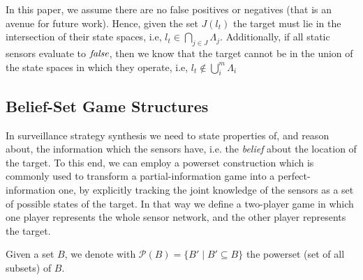 In this paper, we assume there are no false positives or negatives (that is an avenue for future work). Hence, given the set $J(l_t)$ the target must lie in the intersection of their state spaces, i.e, $l_t \in \bigcap_{j\in J}\Lambda_j$. Additionally, if all static sensors evaluate to $\mathit{false}$, then we know that the target cannot be in the union of the state spaces in which they operate, i.e, $l_t \notin \bigcup_{i}^m \Lambda_i$


\subsection{Belief-Set Game Structures}\label{sec:belief-gs}

In surveillance strategy synthesis we need to state properties of, and reason about, the information which the sensors have, i.e. the \emph{belief} about the location of the target. To this end, we can employ a powerset construction which is commonly used to transform a partial-information game into a perfect-information one, by explicitly tracking the joint knowledge of the sensors as a set of possible states of the target. In that way we define a two-player game in which one player represents the whole sensor network, and the other player represents the target.

Given a set $B$, we denote with $\mathcal{P}(B) = \{B' \mid B'\subseteq B\}$ the powerset (set of all subsets) of $B$.

